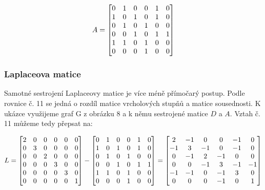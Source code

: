 \documentclass[czech, master, public, dept460, male, cpdeclaration, oneside]{diploma}
\begin{document}
\begin{equation}
\vspace*{+3.0mm}
A = \begin{bmatrix} 
0 & 1 & 0 & 0 & 1 & 0 \\
1 & 0 & 1 & 0 & 1& 0 \\
0 & 1 & 0 & 1 & 0 & 0 \\
0 & 0 & 1 & 0 & 1& 1 \\
1 & 1 & 0 & 1& 0 & 0 \\
0 & 0 & 0 & 1 & 0 & 0
\end{bmatrix}
\end{equation}

\subsubsection{Laplaceova matice}
Samotné sestrojení Laplaceovy matice je více méně přímočarý postup. Podle rovnice č. 11 se jedná o rozdíl matice vrcholových stupňů a matice sousednosti. K ukázce využijeme graf G z obrázku 8 a k němu sestrojené matice $D$ a $A$. \cite{Dostal} Vztah č. 11 můžeme tedy přepsat na:

\begin{equation}
\vspace*{+3.0mm}
L = \begin{bmatrix} 
2 & 0 & 0 & 0 & 0 & 0 \\
0 & 3 & 0 & 0 & 0 & 0 \\
0 & 0 & 2 & 0 & 0 & 0 \\
0 & 0 & 0 & 3 & 0 & 0 \\
0 & 0 & 0 & 0 & 3 & 0 \\
0 & 0 & 0 & 0 & 0 & 1
\end{bmatrix} 
-
\begin{bmatrix} 
0 & 1 & 0 & 0 & 1 & 0 \\
1 & 0 & 1 & 0 & 1& 0 \\
0 & 1 & 0 & 1 & 0 & 0 \\
0 & 0 & 1 & 0 & 1& 1 \\
1 & 1 & 0 & 1& 0 & 0 \\
0 & 0 & 0 & 1 & 0 & 0
\end{bmatrix}
=
\begin{bmatrix} 
2 & -1 & 0 & 0 & -1 & 0 \\
-1 & 3 & -1 & 0 & -1 & 0 \\
0 & -1 & 2 & -1 & 0 & 0 \\
0 & 0 & -1 & 3 & -1 & -1 \\
-1 & -1 & 0 & -1 & 3 & 0 \\
0 & 0 & 0 & -1 & 0 & 1
\end{bmatrix}
\end{equation}
\end{document}
